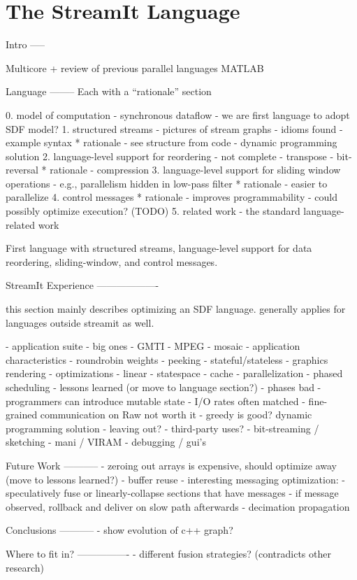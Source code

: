 \chapter{The StreamIt Language}



Intro
-----

Multicore + review of previous parallel languages
MATLAB

Language
--------
Each with a ``rationale'' section

0. model of computation
  - synchronous dataflow
  - we are first language to adopt SDF model?
1. structured streams
  - pictures of stream graphs
  - idioms found
  - example syntax
  * rationale
    - see structure from code
    - dynamic programming solution
2. language-level support for reordering
  - not complete
  - transpose
  - bit-reversal
  * rationale
    - compression
3. language-level support for sliding window operations
  - e.g., parallelism hidden in low-pass filter
  * rationale
    - easier to parallelize
4. control messages
  * rationale
    - improves programmability
    - could possibly optimize execution?  (TODO)
5. related work
  - the standard language-related work

First language with structured streams, language-level support for
data reordering, sliding-window, and control messages.

StreamIt Experience
-------------------

this section mainly describes optimizing an SDF language. generally
applies for languages outside streamit as well.

- application suite
  - big ones
    - GMTI
    - MPEG
    - mosaic
  - application characteristics
    - roundrobin weights
    - peeking
    - stateful/stateless
  - graphics rendering
- optimizations
  - linear
  - statespace
  - cache
  - parallelization
  - phased scheduling
- lessons learned (or move to language section?)
  - phases bad
  - programmers can introduce mutable state
  - I/O rates often matched
  - fine-grained communication on Raw not worth it
  - greedy is good?  dynamic programming solution
- leaving out?
  - third-party uses?
    - bit-streaming / sketching
    - mani / VIRAM
  - debugging / gui's

Future Work
-----------
- zeroing out arrays is expensive, should optimize away (move to lessons learned?)
- buffer reuse
- interesting messaging optimization:
  - speculatively fuse or linearly-collapse sections that have messages
  - if message observed, rollback and deliver on slow path afterwards
- decimation propagation

Conclusions
-----------
- show evolution of c++ graph?


Where to fit in?
----------------
- different fusion strategies?  (contradicts other research)

